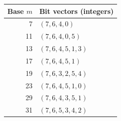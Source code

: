 \documentclass[10pt]{article}
\numberwithin{equation}{section}
\begin{document}
\begin{center}
\begin{minipage}{\linewidth}
\centering\small
{}
\label{finite:tab:linear-codes}
\begin{tabular}{rl}\toprule
Base $m$&Bit vectors (integers)\\\midrule
7&$(7,6,4,0)$\\
11&$(7,6,4,0,5)$\\
13&$(7,6,4,5,1,3)$\\
17&$(7,6,4,5,1)$\\
19&$(7,6,3,2,5,4)$\\
23&$(7,6,4,5,1,0)$\\
29&$(7,6,4,3,5,1)$\\
31&$(7,6,5,3,4,2)$\\
\bottomrule
\end{tabular}
\end{minipage}
\end{center}
\end{document}
